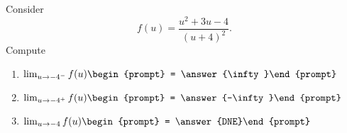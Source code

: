 \documentclass{ximera}
\author{Bart Snapp}
\begin{document}
\begin{exercise}
Consider 
\[
f(u) = \frac{u^2+3 u-4}{(u+4)^2}.
\]
Compute
\begin{enumerate}
\item $\lim_{u\to -4^- } f(u) \begin{prompt} = \answer{\infty}\end{prompt}$
\item $\lim_{u\to -4^+ } f(u) \begin{prompt} = \answer{-\infty}\end{prompt}$
\item $\lim_{u\to -4 } f(u) \begin{prompt} = \answer{DNE}\end{prompt}$
\end{enumerate}
\end{exercise}
\end{document}
